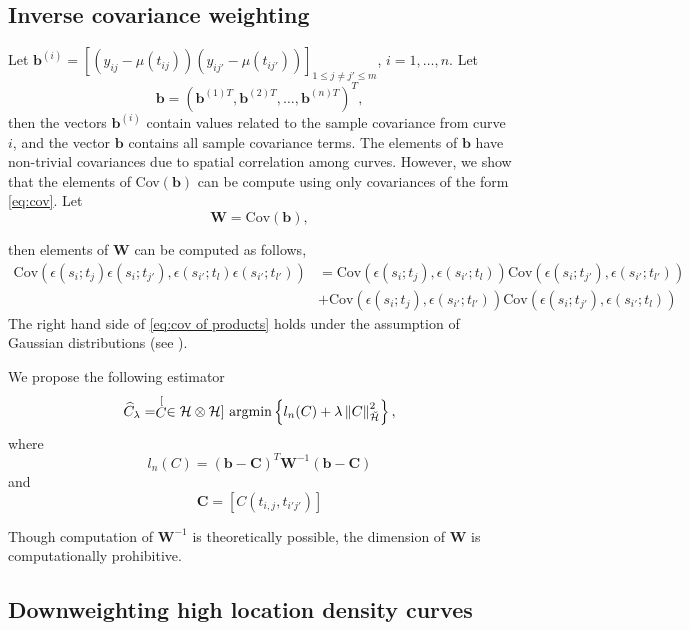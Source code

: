 \subsection{Inverse covariance weighting} \label{sec:adjustments to the covariance}

Let $\mathbf{b}^{(i)} = [(y_{ij}-\mu(t_{ij}))(y_{ij'}-\mu(t_{ij'}))]_{1\leq j\neq j'\leq m}$, $i=1, \dots, n$. Let
\[ \mathbf{b} = (\mathbf{b}^{(1)T}, \mathbf{b}^{(2)T}, \dots, \mathbf{b}^{(n)T} )^T, \]
then the vectors $\mathbf{b}^{(i)}$ contain values related to the sample covariance from curve $i$, and the vector $\mathbf{b}$ contains all sample covariance terms. The elements of $\mathbf{b}$ have non-trivial covariances due to spatial correlation among curves. However, we show that the elements of Cov$(\mathbf{b})$ can be compute using only covariances of the form \eqref{eq:cov}. Let
\[ \mathbf{W}= \text{Cov}(\mathbf{b}), \]

then elements of $\mathbf{W}$ can be computed as follows, 
\begin{align}
	\text{Cov}(\epsilon(s_i; t_{j}) \epsilon(s_i;t_{j'}), \epsilon(s_{i'}; t_{l}) \epsilon(s_{i'};t_{l'}) ) &= \text{Cov}(\epsilon(s_i; t_{j}), \epsilon(s_{i'}; t_{l}))\text{Cov}( \epsilon(s_i;t_{j'}), \epsilon(s_{i'};t_{l'}) ) \nonumber \\
	&+ \text{Cov}(\epsilon(s_i; t_{j}), \epsilon(s_{i'};t_{l'}) )\text{Cov}(\epsilon(s_i;t_{j'}), \epsilon(s_{i'}; t_{l})) \label{eq:cov of products} 
\end{align}
The right hand side of \eqref{eq:cov of products} holds under the assumption of Gaussian distributions (see \cite{Bohrnstedt:2010ud}). 

We propose the following estimator
\begin{equation}
	\widehat{C}_{\lambda}=\stackrel[C \in \mathcal{H}\otimes \mathcal{H}]{}{\text{ argmin}} \left\{ l_{n}(C)+\lambda\left\Vert C\right\Vert _{\breve{\mathcal{H}}}^{2} \right\}, 
	\label{covest}
\end{equation} 
where 
\begin{equation}
	l_{n}(C)= (\mathbf{b} - \mathbf{C})^T\mathbf{W}^{-1}(\mathbf{b} - \mathbf{C}) 
	\label{eq:weighted loss function} 
\end{equation}
and
\[ \mathbf{C} = [C(t_{i,j}, t_{i'j'})] \]

Though computation of $\mathbf{W}^{-1}$ is theoretically possible, the dimension of $\mathbf{W}$ is computationally prohibitive. 

\subsection{Downweighting high location density curves} %
\label{sub:downweighting_high_location_density_curves}


